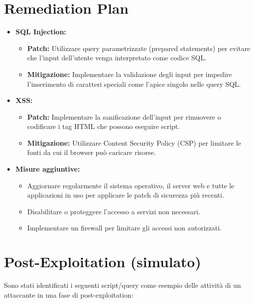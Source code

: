 \documentclass[12pt]{article}
\begin{document}
\section{Remediation Plan}
\begin{itemize}
    \item \textbf{SQL Injection:}
    \begin{itemize}
        \item \textbf{Patch:} Utilizzare query parametrizzate (prepared statements) 
        per evitare che l'input dell'utente venga interpretato come codice SQL.
        \item \textbf{Mitigazione:} Implementare la validazione degli input per 
        impedire l'inserimento di caratteri speciali come l'apice singolo nelle 
        query SQL.
    \end{itemize}
    \item \textbf{XSS:}
    \begin{itemize}
        \item \textbf{Patch:} Implementare la sanificazione dell'input per rimuovere 
        o codificare i tag HTML che possono eseguire script.
        \item \textbf{Mitigazione:} Utilizzare Content Security Policy (CSP) per 
        limitare le fonti da cui il browser pu\`{o} caricare risorse.
    \end{itemize}
    \item \textbf{Misure aggiuntive:}
    \begin{itemize}
        \item Aggiornare regolarmente il sistema operativo, il server web e tutte 
        le applicazioni in uso per applicare le patch di sicurezza pi\`{u} recenti.
        \item Disabilitare o proteggere l'accesso a servizi non necessari.
        \item Implementare un firewall per limitare gli accessi non autorizzati.
    \end{itemize}
\end{itemize}

\section{Post-Exploitation (simulato)}

Sono stati identificati i seguenti script/query come esempio delle attivit\`{a} 
di un attaccante in una fase di post-exploitation:
\end{document}
